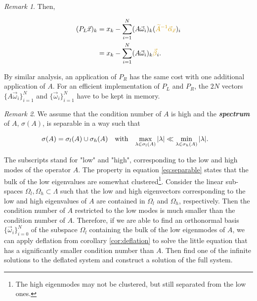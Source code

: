 \documentclass{article}
\theoremstyle{plain} %
\theoremstyle{convention} %
\theoremstyle{remark} %
\newtheorem*{remark}{Remark} %
\def\df#1{\textbf{\textit{#1}}}
\numberwithin{equation}{section}
\begin{document}
\begin{remark}
Then,

\begin{align*}
    (P_L\vec{x})_k &= x_k - \sum_{i=1}^N (A\vec{\omega}_i)_k ( \textcolor{cyellow}{\widetilde{A}^{-1} \vec{\alpha}_{\vec{x}}} )_i \\
    &= x_k - \sum_{i=1}^N (A\vec{\omega}_i)_k \textcolor{cyellow}{\vec{\beta}}_i.
\end{align*}

By similar analysis, an application of $P_R$ has the same cost with one additional application of $A$. For an efficient implementation of $P_L$ and $P_R$, the $2N$ vectors $\{A\vec{\omega}_i\}_{i=1}^N$ and $\{\vec{\omega}_i\}_{i=1}^N$ have to be kept in memory.

\end{remark}

\begin{remark}


We assume that the condition number of $A$ is high and the \df{spectrum} of $A$, $\sigma(A)$, is separable in a way such that

\begin{align}
    \sigma(A) &= \sigma_l(A) \cup \sigma_h(A)
    & &\text{with} &
    \max\limits_{\lambda \in \sigma_l(A)} \abs{\lambda} &\ll \min\limits_{\lambda \in \sigma_h(A)} \abs{\lambda}. \label{eq:separable}
\end{align}

The subscripts stand for "low" and "high", corresponding to the low and high modes of the operator $A$. The property in equation \eqref{eq:separable} states that the bulk of the low eigenvalues are somewhat clustered\footnote{The high eigenmodes may not be clustered, but still separated from the low ones.}. Consider the linear sub-spaces $\Omega_l, \Omega_h \subset \Lambda$ such that the low and high eigenvectors corresponding to the low and high eigenvalues of $A$ are contained in $\Omega_l$ and $\Omega_h$, respectively. Then the condition number of $A$ restricted to the low modes is much smaller than the condition number of $A$. Therefore, if we are able to find an orthonormal basis $\{\vec{\omega}_i\}_{i=0}^N$ of the subspace $\Omega_l$ containing the bulk of the low eigenmodes of $A$, we can apply deflation from corollary \ref{cor:deflation} to solve the little equation that has a significantly smaller condition number than $A$. Then find one of the infinite solutions to the deflated system and construct a solution of the full system.


\end{remark}
\end{document}
